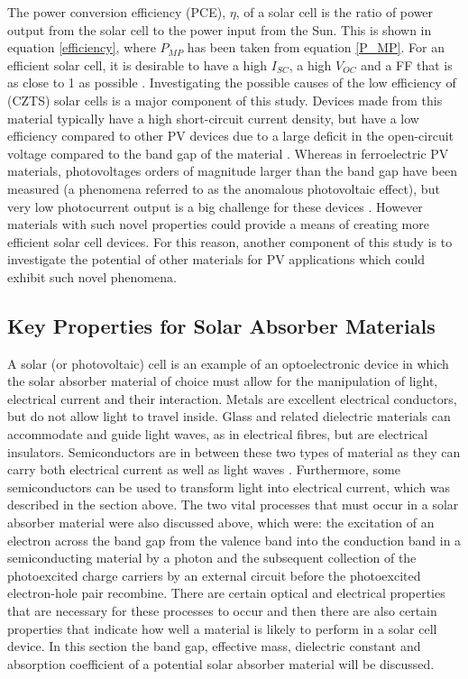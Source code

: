 The power conversion efficiency (PCE), $\eta$, of a solar cell is the ratio of power output from the solar cell to the power input from the Sun. This is shown in equation \ref{efficiency}, where $P_{MP}$ has been taken from equation \ref{P_MP}.
For an efficient solar cell, it is desirable to have a high $I_{SC}$, a high $V_{OC}$ and a FF that is as close to 1 as possible \cite{handbook}. Investigating the possible causes of the low efficiency of {\CZTS} (CZTS) solar cells is a major component of this study. Devices made from this material typically have a high short-circuit current density, but have a low efficiency compared to other PV devices due to a large deficit in the open-circuit voltage compared to the band gap of the material \cite{band_tailing_new}.
Whereas in ferroelectric PV materials, photovoltages orders of magnitude larger than the band gap have been measured (a phenomena referred to as the anomalous photovoltaic effect), but very low photocurrent output is a big challenge for these devices \cite{FE_PV_rev1}. However materials with such novel properties could provide a means of creating more efficient solar cell devices. For this reason, another component of this study is to investigate the potential of other materials for PV applications which could exhibit such novel phenomena.\\


\subsection{Key Properties for Solar Absorber Materials}\label{PV_properties}

A solar (or photovoltaic) cell is an example of an optoelectronic device in which the solar absorber material of choice must allow for the manipulation of light, electrical current and their interaction. Metals are excellent electrical conductors, but do not allow light to travel inside. Glass and related dielectric materials can accommodate and guide light waves, as in electrical fibres, but are electrical insulators. Semiconductors are in between these two types of material as they can carry both electrical current as well as light waves \cite{mat_prop1}. Furthermore, some semiconductors can be used to transform light into electrical current, which was described in the section above. The two vital processes that must occur in a solar absorber material were also discussed above, which were: the excitation of an electron across the band gap from the valence band into the conduction band in a semiconducting material by a photon and the subsequent collection of the photoexcited charge carriers by an external circuit before the photoexcited electron-hole pair recombine. There are certain optical and electrical properties that are necessary for these processes to occur and then there are also certain properties that indicate how well a material is likely to perform in a solar cell device. In this section the band gap, effective mass, dielectric constant and absorption coefficient of a potential solar absorber material will be discussed.

